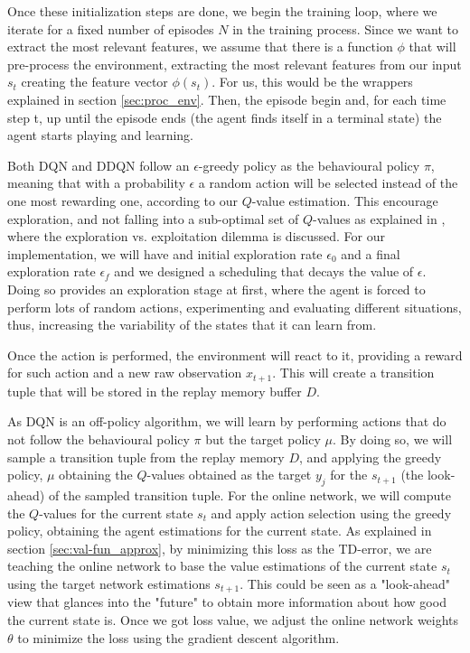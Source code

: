 Once these initialization steps are done, we begin the training loop, where we iterate for a fixed number of episodes $N$ in the training process. Since we want to extract the most relevant features, we assume that there is a function $\phi$ that will pre-process the environment, extracting the most relevant features from our input $s_t$ creating the feature vector $\phi(s_t)$. For us, this would be the wrappers explained in section \ref{sec:proc_env}. Then, the episode begin and, for each time step t, up until the episode ends (the agent finds itself in a terminal state) the agent starts playing and learning.

Both DQN and DDQN follow an $\epsilon$-greedy policy as the behavioural policy $\pi$, meaning that with a probability $\epsilon$ a random action will be selected instead of the one most rewarding one, according to our $Q$-value estimation. This encourage exploration, and not falling into a sub-optimal set of $Q$-values as explained in \cite{exploitation_vs_exploration}, where the exploration vs. exploitation dilemma is discussed. For our implementation, we will have and initial exploration rate $\epsilon_0$ and a final exploration rate $\epsilon_f$ and we designed a scheduling that decays the value of $\epsilon$. Doing so provides an exploration stage at first, where the agent is forced to perform lots of random actions, experimenting and evaluating different situations, thus, increasing the variability of the states that it can learn from.

Once the action is performed, the environment will react to it, providing a reward for such action and a new raw observation $x_{t+1}$. This will create a transition tuple that will be stored in the replay memory buffer $D$. 

As DQN is an off-policy algorithm, we will learn by performing actions that do not follow the behavioural policy $\pi$ but the target policy $\mu$. By doing so, we will sample a transition tuple from the replay memory $D$, and applying the greedy policy, $\mu$ obtaining the $Q$-values obtained as the target $y_j$ for the $s_{t+1}$ (the look-ahead) of the sampled transition tuple. For the online network, we will compute the $Q$-values for the current state $s_t$ and apply action selection using the greedy policy, obtaining the agent estimations for the current state. As explained in section \ref{sec:val-fun_approx}, by minimizing this loss as the TD-error, we are teaching the online network to base the value estimations of the current state $s_t$ using the target network estimations $s_{t+1}$. This could be seen as a "look-ahead" view that glances into the "future" to obtain more information about how good the current state is. Once we got loss value, we adjust the online network weights $\theta$ to minimize the loss using the gradient descent algorithm. 

